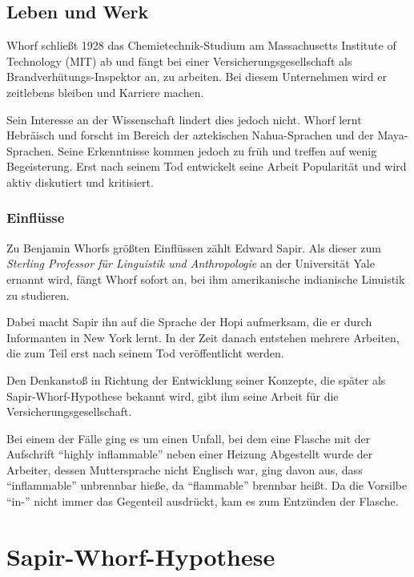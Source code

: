 \documentclass[12pt]{scrreprt}
\begin{document}
	\section{Leben und Werk}
	\label{sec:lebenuwerk}
	Whorf schließt 1928 das Chemietechnik-Studium am Massachusetts Institute of
	Technology (MIT) ab und fängt bei einer Versicherungsgesellschaft als
	Brandverhütungs-Inspektor an, zu arbeiten. Bei diesem Unternehmen wird er
	zeitlebens bleiben und Karriere machen.

	Sein Interesse an der Wissenschaft lindert dies jedoch nicht. Whorf lernt
	Hebräisch und forscht im Bereich der aztekischen Nahua-Sprachen und der
	Maya-Sprachen. Seine Erkenntnisse kommen jedoch zu früh und treffen auf wenig
	Begeisterung. Erst nach seinem Tod entwickelt seine Arbeit Popularität und
	wird aktiv diskutiert und kritisiert.
		\subsection{Einflüsse}
		\label{sec:einfluesse}
		Zu Benjamin Whorfs größten Einflüssen zählt Edward Sapir. Als dieser zum
		\textit{Sterling Professor für Linguistik und Anthropologie} an der
		Universität Yale ernannt wird, fängt Whorf sofort an, bei ihm amerikanische
		indianische Linuistik zu studieren.

		Dabei macht Sapir ihn auf die Sprache der Hopi aufmerksam, die er durch
		Informanten in New York lernt. In der Zeit danach entstehen mehrere Arbeiten,
		die zum Teil erst nach seinem Tod veröffentlicht werden.

		Den Denkanstoß in Richtung der Entwicklung seiner Konzepte, die später als
		Sapir-Whorf-Hypothese bekannt wird, gibt ihm seine Arbeit für die
		Versicherungsgesellschaft.

		Bei einem der Fälle ging es um einen Unfall, bei dem eine Flasche mit der
		Aufschrift \enquote{highly inflammable} neben einer Heizung Abgestellt wurde
		der Arbeiter, dessen Muttersprache nicht Englisch war, ging davon aus, dass
		\enquote{inflammable} unbrennbar hieße, da \enquote{flammable} brennbar
		heißt. Da die Vorsilbe \enquote{in-} nicht immer das Gegenteil ausdrückt,
		kam es zum Entzünden der Flasche.\autocite{wiki:Benjamin_Lee_Whorf}

\chapter{Sapir-Whorf-Hypothese}
\label{chap:sawo_hypothese}
\end{document}

